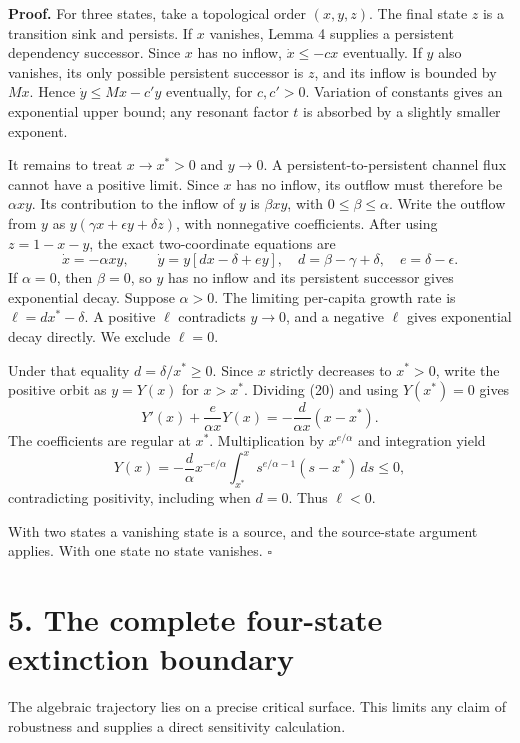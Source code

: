 \documentclass[
  11pt,
  a4paper,
]{scrartcl}
\begin{document}
\textbf{Proof.} For three states, take a topological order \((x,y,z)\).
The final state \(z\) is a transition sink and persists. If \(x\)
vanishes, Lemma 4 supplies a persistent dependency successor. Since
\(x\) has no inflow, \(\dot x\le-cx\) eventually. If \(y\) also
vanishes, its only possible persistent successor is \(z\), and its
inflow is bounded by \(Mx\). Hence \(\dot y\le Mx-c'y\) eventually, for
\(c,c'>0\). Variation of constants gives an exponential upper bound; any
resonant factor \(t\) is absorbed by a slightly smaller exponent.

It remains to treat \(x\to x^*>0\) and \(y\to0\). A
persistent-to-persistent channel flux cannot have a positive limit.
Since \(x\) has no inflow, its outflow must therefore be \(\alpha xy\).
Its contribution to the inflow of \(y\) is \(\beta xy\), with
\(0\le\beta\le\alpha\). Write the outflow from \(y\) as
\(y(\gamma x+\epsilon y+\delta z)\), with nonnegative coefficients.
After using \(z=1-x-y\), the exact two-coordinate equations are \[
\dot x=-\alpha xy,\qquad
\dot y=y[dx-\delta+ey],
\quad d=\beta-\gamma+\delta,\quad e=\delta-\epsilon.
\tag{20}
\] If \(\alpha=0\), then \(\beta=0\), so \(y\) has no inflow and its
persistent successor gives exponential decay. Suppose \(\alpha>0\). The
limiting per-capita growth rate is \(\ell=dx^*-\delta\). A positive
\(\ell\) contradicts \(y\to0\), and a negative \(\ell\) gives
exponential decay directly. We exclude \(\ell=0\).

Under that equality \(d=\delta/x^*\ge0\). Since \(x\) strictly decreases
to \(x^*>0\), write the positive orbit as \(y=Y(x)\) for \(x>x^*\).
Dividing (20) and using \(Y(x^*)=0\) gives \[
Y'(x)+\frac e{\alpha x}Y(x)
=-\frac d{\alpha x}(x-x^*).
\] The coefficients are regular at \(x^*\). Multiplication by
\(x^{e/\alpha}\) and integration yield \[
Y(x)=-\frac d\alpha x^{-e/\alpha}
\int_{x^*}^{x}s^{e/\alpha-1}(s-x^*)\,ds\le0,
\tag{21}
\] contradicting positivity, including when \(d=0\). Thus \(\ell<0\).

With two states a vanishing state is a source, and the source-state
argument applies. With one state no state vanishes. \(\square\)

\section{5. The complete four-state extinction
boundary}\label{the-complete-four-state-extinction-boundary}

The algebraic trajectory lies on a precise critical surface. This limits
any claim of robustness and supplies a direct sensitivity calculation.
\end{document}
